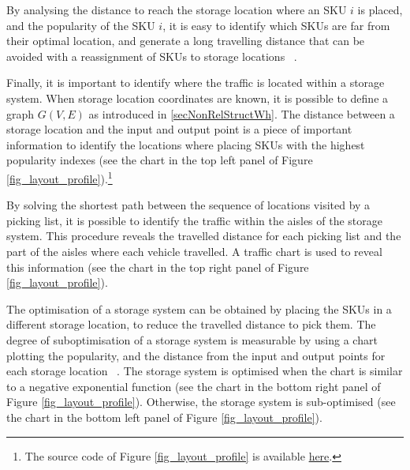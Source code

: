 By analysing the distance to reach the storage location where an SKU $i$ is placed, and the popularity of the SKU $i$, it is easy to identify which SKUs are far from their optimal location, and generate a long travelling distance that can be avoided with a reassignment of SKUs to storage locations ~\cite{Manzini2018}.\par

Finally, it is important to identify where the traffic is located within a storage system.  When storage location coordinates are known, it is possible to define a graph $G(V,E)$ as introduced in \ref{secNonRelStructWh}. The distance between a storage location and the input and output point is a piece of important information to identify the locations where placing SKUs with the highest popularity indexes (see the chart in the top left panel of Figure \ref{fig_layout_profile}).\footnote{The source code of Figure \ref{fig_layout_profile} is available \href{https://github.com/aletuf93/logproj/blob/master/examples/WH_04\%20Warehouse\%20layout\%20assessment.ipynb}{here}.} \par

By solving the shortest path between the sequence of locations visited by a picking list, it is possible to identify the traffic within the aisles of the storage system. This procedure reveals the travelled distance for each picking list and the part of the aisles where each vehicle travelled. A traffic chart is used to reveal this information (see the chart in the top right panel of Figure \ref{fig_layout_profile}). \par

The optimisation of a storage system can be obtained by placing the SKUs in a different storage location, to reduce the travelled distance to pick them. The degree of suboptimisation of a storage system is measurable by using a chart plotting the popularity, and the distance from the input and output points for each storage location ~\cite{Manzini2018}. The storage system is optimised when the chart is similar to a negative exponential function (see the chart in the bottom right panel of Figure \ref{fig_layout_profile}). Otherwise, the storage system is sub-optimised (see the chart in the bottom left panel of Figure \ref{fig_layout_profile}). \par

